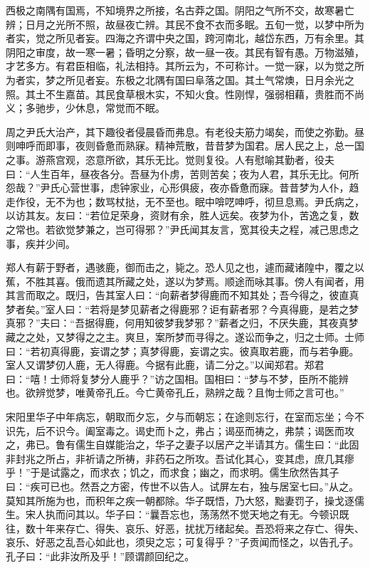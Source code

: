 \documentclass[]{article}
\begin{document}
西极之南隅有国焉，不知境界之所接，名古莽之国。阴阳之气所不交，故寒暑亡辨；日月之光所不照，故昼夜亡辨。其民不食不衣而多眠。五旬一觉，以梦中所为者实，觉之所见者妄。四海之齐谓中央之国，跨河南北，越岱东西，万有余里。其阴阳之审度，故一寒一暑；昏明之分察，故一昼一夜。其民有智有愚。万物滋殖，才艺多方。有君臣相临，礼法相持。其所云为，不可称计。一觉一寐，以为觉之所为者实，梦之所见者妄。东极之北隅有国曰阜落之国。其土气常燠，日月余光之照。其土不生嘉苗。其民食草根木实，不知火食。性刚悍，强弱相藉，贵胜而不尚义；多驰步，少休息，常觉而不眠。

周之尹氏大治产，其下趣役者侵晨昏而弗息。有老役夫筋力竭矣，而使之弥勤。昼则呻呼而即事，夜则昏惫而熟寐。精神荒散，昔昔梦为国君。居人民之上，总一国之事。游燕宫观，恣意所欲，其乐无比。觉则复役。人有慰喻其勤者，役夫曰：``人生百年，昼夜各分。吾昼为仆虏，苦则苦矣；夜为人君，其乐无比。何所怨哉？''尹氏心营世事，虑钟家业，心形俱疲，夜亦昏惫而寐。昔昔梦为人仆，趋走作役，无不为也；数骂杖挞，无不至也。眠中啽呓呻呼，彻旦息焉。尹氏病之，以访其友。友曰：``若位足荣身，资财有余，胜人远矣。夜梦为仆，苦逸之复，数之常也。若欲觉梦兼之，岂可得邪？''尹氏闻其友言，宽其役夫之程，减己思虑之事，疾并少间。

郑人有薪于野者，遇骇鹿，御而击之，毙之。恐人见之也，遽而藏诸隍中，覆之以蕉，不胜其喜。俄而遗其所藏之处，遂以为梦焉。顺途而咏其事。傍人有闻者，用其言而取之。既归，告其室人曰：``向薪者梦得鹿而不知其处；吾今得之，彼直真梦者矣。''室人曰：``若将是梦见薪者之得鹿邪？讵有薪者邪？今真得鹿，是若之梦真邪？''夫曰：``吾据得鹿，何用知彼梦我梦邪？''薪者之归，不厌失鹿，其夜真梦藏之之处，又梦得之之主。爽旦，案所梦而寻得之。遂讼而争之，归之士师。士师曰：``若初真得鹿，妄谓之梦；真梦得鹿，妄谓之实。彼真取若鹿，而与若争鹿。室人又谓梦仞人鹿，无人得鹿。今据有此鹿，请二分之。''以闻郑君。郑君曰：``嘻！士师将复梦分人鹿乎？''访之国相。国相曰：``梦与不梦，臣所不能辨也。欲辨觉梦，唯黄帝孔丘。今亡黄帝孔丘，熟辨之哉？且恂士师之言可也。''

宋阳里华子中年病忘，朝取而夕忘，夕与而朝忘；在途则忘行，在室而忘坐；今不识先，后不识今。阖室毒之。谒史而卜之，弗占；谒巫而祷之，弗禁；谒医而攻之，弗已。鲁有儒生自媒能治之，华子之妻子以居产之半请其方。儒生曰：``此固非封兆之所占，非祈请之所祷，非药石之所攻。吾试化其心，变其虑，庶几其瘳乎！''于是试露之，而求衣；饥之，而求食；幽之，而求明。儒生欣然告其子曰：``疾可已也。然吾之方密，传世不以告人。试屏左右，独与居室七曰。''从之。莫知其所施为也，而积年之疾一朝都除。华子既悟，乃大怒，黜妻罚子，操戈逐儒生。宋人执而问其以。华子曰：``曩吾忘也，荡荡然不觉天地之有无。今顿识既往，数十年来存亡、得失、哀乐、好恶，扰扰万绪起矣。吾恐将来之存亡、得失、哀乐、好恶之乱吾心如此也，须臾之忘；可复得乎？''子贡闻而怪之，以告孔子。孔子曰：``此非汝所及乎！''顾谓颜回纪之。
\end{document}
